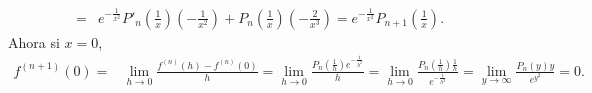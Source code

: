 \begin{eg}
\[\begin{split}
	= &  e^{-\frac{1}{x^{2}}}P'_{n}\left(\frac{1}{x}\right)\left(-\frac{1}{x^{2}}\right) + P_{n}\left(\frac{1}{x}\right)\left(-\frac{2}{x^{3}}\right) = e^{-\frac{1}{x^{2}}}P_{n+1}\left(\frac{1}{x}\right).
\end{split}
\]
Ahora si $\displaystyle x = 0 $, 
\[
\begin{split}
	f^{\left(n+1\right)}\left(0\right) = & \lim_{h \to 0}\frac{f^{\left(n\right)}\left(h\right)-f^{\left(n\right)}\left(0\right)}{h} = \lim_{h \to 0}\frac{P_{n}\left(\frac{1}{h}\right)e^{-\frac{1}{h^{2}}}}{h}  = \lim_{h \to 0}\frac{P_{n}\left(\frac{1}{h}\right)\frac{1}{h}}{e^{-\frac{1}{h^{2}}}}= \lim_{y \to \infty}\frac{P_{n}\left(y\right)y}{e^{y^{2}}} = 0.
\end{split}
\]
\end{eg}
